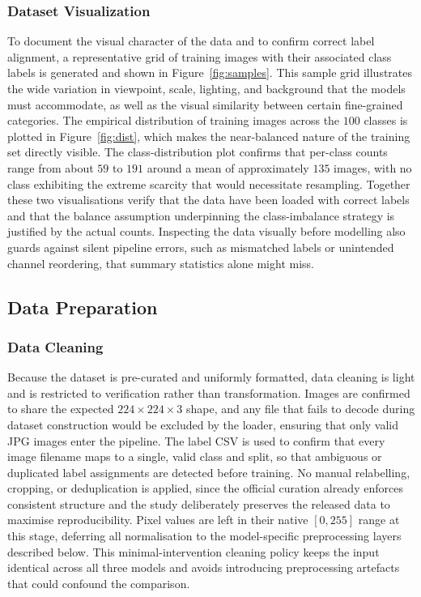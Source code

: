 \subsubsection{Dataset Visualization}
\label{subsubsec:method-visualization}

To document the visual character of the data and to confirm correct label alignment, a representative grid of training images with their associated class labels is generated and shown in Figure~\ref{fig:samples}.
This sample grid illustrates the wide variation in viewpoint, scale, lighting, and background that the models must accommodate, as well as the visual similarity between certain fine-grained categories.
The empirical distribution of training images across the $100$ classes is plotted in Figure~\ref{fig:dist}, which makes the near-balanced nature of the training set directly visible.
The class-distribution plot confirms that per-class counts range from about $59$ to $191$ around a mean of approximately $135$ images, with no class exhibiting the extreme scarcity that would necessitate resampling.
Together these two visualisations verify that the data have been loaded with correct labels and that the balance assumption underpinning the class-imbalance strategy is justified by the actual counts.
Inspecting the data visually before modelling also guards against silent pipeline errors, such as mismatched labels or unintended channel reordering, that summary statistics alone might miss.

\subsection{Data Preparation}
\label{subsec:method-prep}

\subsubsection{Data Cleaning}
\label{subsubsec:method-cleaning}

Because the dataset is pre-curated and uniformly formatted, data cleaning is light and is restricted to verification rather than transformation.
Images are confirmed to share the expected $224\times224\times3$ shape, and any file that fails to decode during dataset construction would be excluded by the loader, ensuring that only valid JPG images enter the pipeline.
The label CSV is used to confirm that every image filename maps to a single, valid class and split, so that ambiguous or duplicated label assignments are detected before training.
No manual relabelling, cropping, or deduplication is applied, since the official curation already enforces consistent structure and the study deliberately preserves the released data to maximise reproducibility.
Pixel values are left in their native $[0,255]$ range at this stage, deferring all normalisation to the model-specific preprocessing layers described below.
This minimal-intervention cleaning policy keeps the input identical across all three models and avoids introducing preprocessing artefacts that could confound the comparison.

